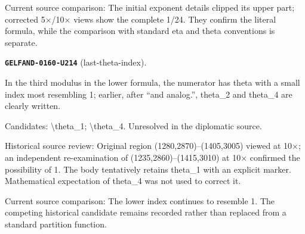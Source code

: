 Current source comparison: The initial exponent details clipped its upper part; corrected 5×/10× views show the complete 1/24. They confirm the literal formula, while the comparison with standard eta and theta conventions is separate.\par\medskip
\par\noindent\leavevmode{}\label{GELFAND-0160-U214}\label{GELFAND-P001479:last-theta-index}\textbf{\texttt{GELFAND-0160-U214}} (last-theta-index).\nopagebreak[4]\par
In the third modulus in the lower formula, the numerator has theta with a small index most resembling 1; earlier, after “and analog.”, theta\_2 and theta\_4 are clearly written.\par
Candidates: \textbackslash{}theta\_1; \textbackslash{}theta\_4. Unresolved in the diplomatic source.\par
Historical source review: Original region (1280,2870)–(1405,3005) viewed at 10×; an independent re-examination of (1235,2860)–(1415,3010) at 10× confirmed the possibility of 1. The body tentatively retains theta\_1 with an explicit marker. Mathematical expectation of theta\_4 was not used to correct it.\par
Current source comparison: The lower index continues to resemble 1. The competing historical candidate remains recorded rather than replaced from a standard partition function.\par\medskip
